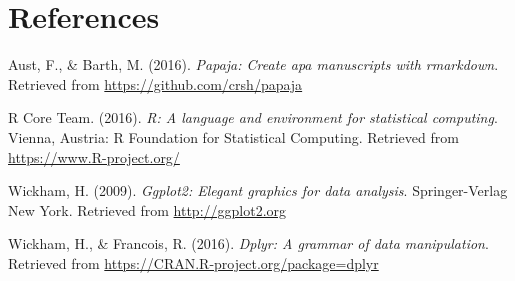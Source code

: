 \documentclass[english,floatsintext,man]{apa6}
\begin{document}
\newpage

\section{References}\label{references}

\setlength{\parindent}{-0.5in} \setlength{\leftskip}{0.5in}

\hypertarget{refs}{}
\hypertarget{ref-R-papaja}{}
Aust, F., \& Barth, M. (2016). \emph{Papaja: Create apa manuscripts with
rmarkdown}. Retrieved from \url{https://github.com/crsh/papaja}

\hypertarget{ref-R-base}{}
R Core Team. (2016). \emph{R: A language and environment for statistical
computing}. Vienna, Austria: R Foundation for Statistical Computing.
Retrieved from \url{https://www.R-project.org/}

\hypertarget{ref-R-ggplot2}{}
Wickham, H. (2009). \emph{Ggplot2: Elegant graphics for data analysis}.
Springer-Verlag New York. Retrieved from \url{http://ggplot2.org}

\hypertarget{ref-R-dplyr}{}
Wickham, H., \& Francois, R. (2016). \emph{Dplyr: A grammar of data
manipulation}. Retrieved from
\url{https://CRAN.R-project.org/package=dplyr}


\clearpage
\renewcommand{\listtablename}{Table captions}
\listoftables

\clearpage
\renewcommand{\listfigurename}{Figure captions}
\listoffigures
\end{document}
